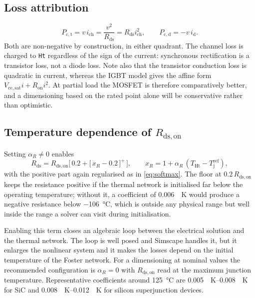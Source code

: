 \documentclass[11pt,a4paper]{article}
\newcommand{\Rdson}{R_\mathrm{ds,on}}
\newcommand{\Tj}{T_\mathrm{j}}
\begin{document}
\subsection{Loss attribution}

\begin{equation}
  P_\mathrm{c,t} = v\,i_\mathrm{ch} = \frac{v^{2}}{R_\mathrm{ds}} = R_\mathrm{ds} i_\mathrm{ch}^{2},
  \qquad
  P_\mathrm{c,d} = -v\,i_\mathrm{d} .
\end{equation}
Both are non-negative by construction, in either quadrant. The channel loss is
charged to \texttt{Ht} regardless of the sign of the current: synchronous
rectification is a transistor loss, not a diode loss. Note also that the
transistor conduction loss is quadratic in current, whereas the IGBT model gives
the affine form $V_\mathrm{ce,sat} i + R_\mathrm{on} i^{2}$. At partial load the
MOSFET is therefore comparatively better, and a dimensioning based on the rated
point alone will be conservative rather than optimistic.

\subsection{Temperature dependence of \texorpdfstring{$\Rdson$}{Rds,on}}

Setting $\alpha_R \ne 0$ enables
\begin{equation}
  R_\mathrm{ds} = \Rdson \Big[\,0.2 + \big[\,x_R - 0.2\,\big]^{+}\,\Big],
  \qquad
  x_R = 1 + \alpha_R\,(T_{\mathrm{Ht}} - \Tj^\mathrm{ref}),
\end{equation}
with the positive part again regularised as in \eqref{eq:softmax}. The floor at
$0.2\,\Rdson$ keeps the resistance positive if the thermal network is
initialised far below the operating temperature; without it, a coefficient of
\SI{0.006}{\per\kelvin} would produce a negative resistance below
\SI{-106}{\celsius}, which is outside any physical range but well inside the
range a solver can visit during initialisation.

Enabling this term closes an algebraic loop between the electrical solution and
the thermal network. The loop is well posed and Simscape handles it, but it
enlarges the nonlinear system and it makes the losses depend on the initial
temperature of the Foster network. For a dimensioning at nominal values the
recommended configuration is $\alpha_R = 0$ with $\Rdson$ read at the maximum
junction temperature. Representative coefficients around \SI{125}{\celsius} are
\SIrange{0.005}{0.008}{\per\kelvin} for SiC and
\SIrange{0.008}{0.012}{\per\kelvin} for silicon superjunction devices.
\end{document}
